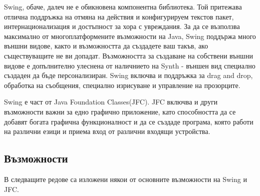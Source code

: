 Swing, обаче, далеч не е обикновена компонентна библиотека. Той
притежава отлична поддръжка на отмяна на действия и конфигурируем
текстов пакет, интернационализация и достъпност за хора с
увреждания. За да се възползва максимално от многоплатформените
възможности на Java, Swing поддържа много външни видове, както и
възможността да създадете ваш такъв, ако съществуващите не ви допадат.
Възможността за създаване на собствени външни видове е допълнително
улеснена от наличнието на Synth - външен вид специално създаден да
бъде персонализиран. Swing включва и поддръжка за drag and drop,
обработка на съобщения, специално изрисуване и управление на
прозорците.

Swing е част от Java Foundation Classes(JFC). JFC включва и други
възможности важни за едно графично приложение, като
способността да се добавят богата графична функционалност и да се
създаде програма, която работи на различни езици и приема вход от
различни входящи устройства.
\subsection{Възможности}
В следващите редове са изложени някои от основните възможности на
Swing и JFC.

